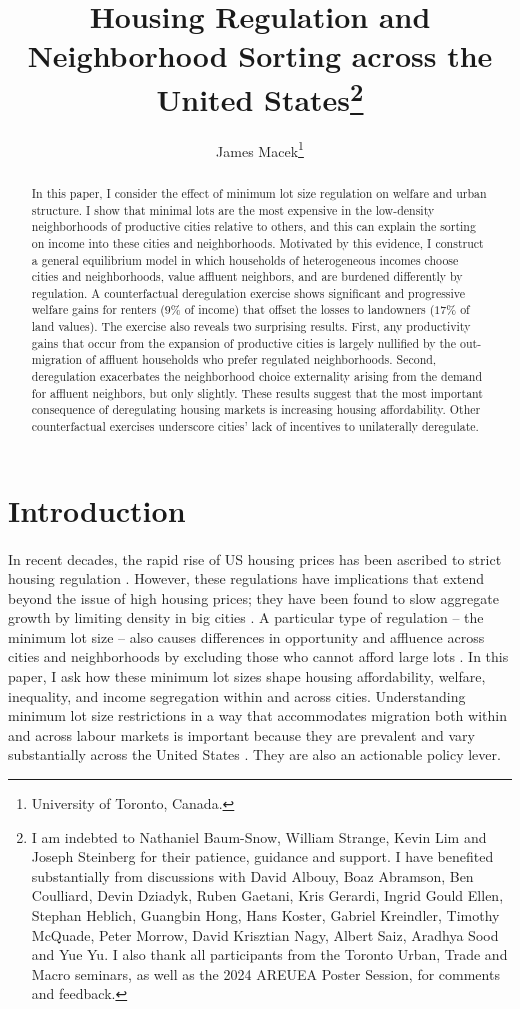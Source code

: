 \documentclass[12pt]{article}
\title{Housing Regulation and Neighborhood Sorting across the United States\footnote{\scriptsize I am indebted to Nathaniel Baum-Snow, William Strange, Kevin Lim and Joseph Steinberg for their patience, guidance and support. I have benefited substantially from discussions with David Albouy, Boaz Abramson, Ben Coulliard, Devin Dziadyk, Ruben Gaetani, Kris Gerardi, Ingrid Gould Ellen, Stephan Heblich, Guangbin Hong, Hans Koster, Gabriel Kreindler, Timothy McQuade, Peter Morrow, David Krisztian Nagy, Albert Saiz, Aradhya Sood and Yue Yu. I also thank all participants from the Toronto Urban, Trade and Macro seminars, as well as the 2024 AREUEA Poster Session, for comments and feedback.}}
\author{James Macek\footnote{\scriptsize University of Toronto, Canada.}}
\begin{document}
\maketitle	
		
\begin{abstract}
	\footnotesize
In this paper, I consider the effect of minimum lot size regulation on welfare and urban structure. I show that minimal lots are the most expensive in the low-density neighborhoods of productive cities relative to others, and this can explain the sorting on income into these cities and neighborhoods. Motivated by this evidence, I construct a general equilibrium model in which households of heterogeneous incomes choose cities and neighborhoods, value affluent neighbors, and are burdened differently by regulation. A counterfactual deregulation exercise shows significant and progressive welfare gains for renters ($9 \%$ of income) that offset the losses to landowners ($17\%$ of land values). The exercise also reveals two surprising results. First, any productivity gains that occur from the expansion of productive cities is largely nullified by the out-migration of affluent households who prefer regulated neighborhoods. Second, deregulation exacerbates the neighborhood choice externality arising from the demand for affluent neighbors, but only slightly. These results suggest that the most important consequence of deregulating housing markets is increasing housing affordability. Other counterfactual exercises underscore cities' lack of incentives to unilaterally deregulate. %


\end{abstract}	
	\newpage	
	\section{Introduction}
		
	\paragraph*{}
	
	In recent decades, the rapid rise of US housing prices has been ascribed to strict housing regulation \citep{molloynathansonpaciorek, superstarcities}. However, these regulations have implications that extend beyond the issue of high housing prices; they have been found to slow aggregate growth by limiting density in big cities \citep{hseihmoretti,durantonpugaurbgrowth}. A particular type of regulation -- the minimum lot size -- also causes differences in opportunity and affluence across cities and neighborhoods by excluding those who cannot afford large lots \citep{Song, kulka}. In this paper, I ask how these minimum lot sizes shape housing affordability, welfare, inequality, and income segregation within and across cities. Understanding minimum lot size restrictions in a way that accommodates migration both within and across labour markets is important because they are prevalent and vary substantially across the United States \citep{gyourko2021}. They are also an actionable policy lever. 
	
\end{document}
